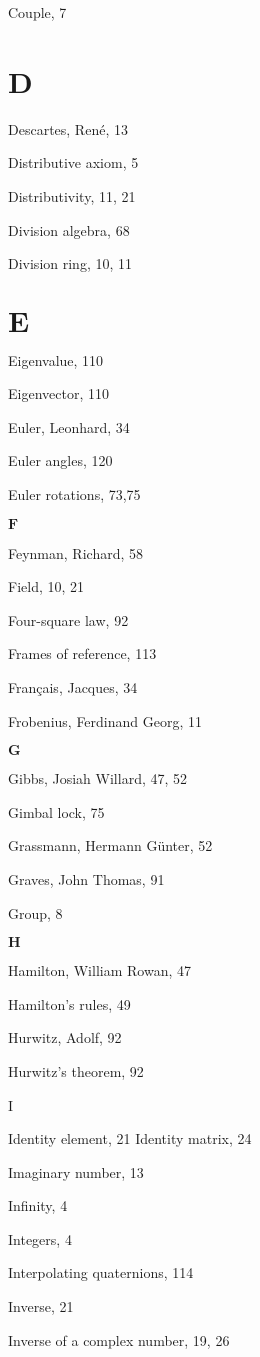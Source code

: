 Couple, 7

\section{D}
Descartes, René, 13

Distributive axiom, 5

Distributivity, 11, 21

Division algebra, 68

Division ring, 10, 11

\section{$\mathbf{E}$}
Eigenvalue, 110

Eigenvector, 110

Euler, Leonhard, 34

Euler angles, 120

Euler rotations, 73,75

$\mathbf{F}$

Feynman, Richard, 58

Field, 10, 21

Four-square law, 92

Frames of reference, 113

Français, Jacques, 34

Frobenius, Ferdinand Georg, 11

$\mathbf{G}$

Gibbs, Josiah Willard, 47, 52

Gimbal lock, 75

Grassmann, Hermann Günter, 52

Graves, John Thomas, 91

Group, 8

$\mathbf{H}$

Hamilton, William Rowan, 47

Hamilton's rules, 49

Hurwitz, Adolf, 92

Hurwitz's theorem, 92

I

Identity element, 21 Identity matrix, 24

Imaginary number, 13

Infinity, 4

Integers, 4

Interpolating quaternions, 114

Inverse, 21

Inverse of a complex number, 19, 26

